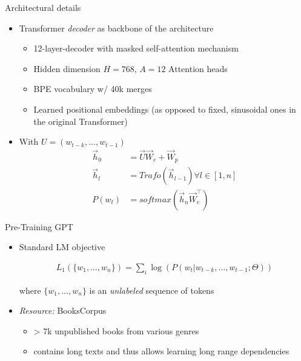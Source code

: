 \begin{frame}{Architectural details}

\vfill

	\begin{itemize}
		\item Transformer \textit{decoder} as backbone of the architecture
			\begin{itemize}
				\item 12-layer-decoder with masked self-attention mechanism
				\item Hidden dimension $H = 768$, $A = 12$ Attention heads
				\item BPE vocabulary w/ 40k merges
				\item Learned positional embeddings (as opposed to fixed, sinusoidal ones in the original Transformer)
			\end{itemize}
		\item With $U = (w_{t-k}, \hdots, w_{t-1})$
\begin{align*}
	\vec h_0 &= \vec U \vec W_e + \vec W_p \\
	\vec h_l &= Trafo(\vec h_{l-1}) \forall l \in [1,n]\\
	P(w_t) &= softmax(\vec h_n \vec W_e^\top)
\end{align*}
	\end{itemize}

\vfill

\end{frame}


\begin{frame}{Pre-Training GPT}

\vfill

\begin{itemize}
		\item Standard LM objective

\begin{align*}
	L_1(\{w_1, \hdots, w_n\}) = \sum_i \log(P(w_t | w_{t-k}, \hdots, w_{t-1}; \Theta))
\end{align*}
					
					where $\{w_1, \hdots, w_n\}$ is an \textit{unlabeled} sequence of tokens

		\item \textit{Resource:} BooksCorpus 
			\begin{itemize}
				\item > 7k unpublished books from various genres
				\item contains long texts and thus allows learning long range dependencies
			\end{itemize}
\end{itemize}

\vfill

\end{frame}


